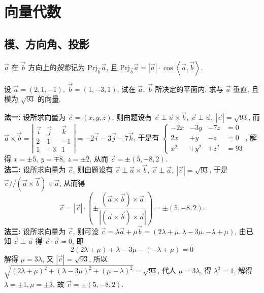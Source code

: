 \section{向量代数}

\subsection{模、方向角、投影}

\begin{definition}[投影]
    $\vec{a}$ 在 $\vec{b}$ 方向上的\textit{投影}记为 $\mathrm{Prj}_{\vec{b} } \vec{a}$, 
    且 $\mathrm{Prj}_{\vec{b} } \vec{a}=|\vec{a}| \cdot \cos\left \langle \vec{a},\vec{b} \right \rangle .$
\end{definition}

\begin{example}
    设 $\vec{a}=(2,1,-1),~\vec{b}=(1,-3,1)$, 试在 $\vec{a},~\vec{b}$ 所决定的平面内, 求与 $\vec{a}$ 垂直, 且模为 $\sqrt{93}$ 的向量.
\end{example}
\begin{solution}
    \textbf{法一: }设所求向量为 $ \vec{c}=(x, y, z)$, 则由题设有 $ \vec{c} \perp \vec{a} \times \vec{b},~ \vec{c} \perp \vec{a},~|\vec{c}|=\sqrt{93}$, 
    而 $ \vec{a} \times \vec{b}=\left|\begin{array}{ccc}\vec{i} & \vec{j} & \vec{k} \\ 2 & 1 & -1 \\ 1 & -3 & 1\end{array}\right|=-2 \vec{i}-3 \vec{j}-7 \vec{k}$, 于是有
    $\left\{\begin{array}{llll}
            -2x & -3y  & -7z  & =0  \\
            2x  & +y   & -z   & =0  \\
            x^2 & +y^2 & +z^2 & =93
        \end{array}\right.$, 解得 $ x=\pm 5,~ y=\mp 8,~ z=\pm 2 $, 从而 $ \vec{c}=\pm(5,-8,2) .$\\
    \textbf{法二: }设所求向量为 $ \vec{c}$, 则由题设有 $ \vec{c} \perp \vec{a} \times \vec{b},~ \vec{c} \perp \vec{a},~|\vec{c}|=\sqrt{93}$, 
    于是 $ \vec{c} / /(\vec{a} \times \vec{b}) \times \vec{a}$, 从而得
    $$ \vec{c}=\left|\vec{c}\right| \cdot\left(\pm \frac{(\vec{a} \times \vec{b}) \times \vec{a}}{|(\vec{a} \times \vec{b}) \times \vec{a}|}\right)=\pm(5,-8,2) .$$
    \textbf{法三: }设所求向量为 $ \vec{c}$, 则可设 $ \vec{c}=\lambda \vec{a}+\mu \vec{b}=(2 \lambda+\mu, \lambda-3 \mu,-\lambda+\mu)$, 
    由已知 $ \vec{c} \perp \vec{a} $ 得 $ \vec{c} \cdot \vec{a}=0$, 即 $$ 2(2 \lambda+\mu)+\lambda-3 \mu-(-\lambda+\mu)=0$$
    解得 $ \mu=3 \lambda$, 又 $ |\vec{c}|=\sqrt{93}$, 所以 $ \sqrt{(2 \lambda+\mu)^{2}+(\lambda-3 \mu)^{2}+(\mu-\lambda)^{2}}=\sqrt{93}$, 
    代人 $ \mu=3 \lambda$, 得 $ \lambda^{2}=1$, 解得 $ \lambda=\pm 1, \mu=\pm 3$, 故 $ \vec{c}=\pm(5,-8,2) .$
\end{solution}

